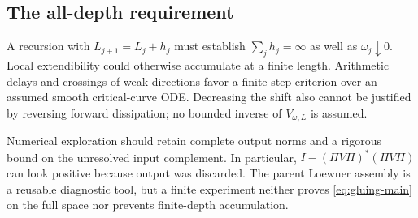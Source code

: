 \subsection{The all-depth requirement}

A recursion with $L_{j+1}=L_j+h_j$ must establish
$\sum_jh_j=\infty$ as well as $\omega_j\downarrow0$.
Local extendibility could otherwise accumulate at a finite length.
Arithmetic delays and crossings of weak directions favor a finite
step criterion over an assumed smooth critical-curve ODE.
Decreasing the shift also cannot be justified by reversing forward
dissipation; no bounded inverse of $V_{\omega,L}$ is assumed.

Numerical exploration should retain complete output norms and a
rigorous bound on the unresolved input complement. In particular,
$I-(\Pi V\Pi)^*(\Pi V\Pi)$ can look positive because output was
discarded. The parent Loewner assembly is a reusable diagnostic
tool, but a finite experiment neither proves
\eqref{eq:gluing-main} on the full space nor prevents finite-depth
accumulation.
